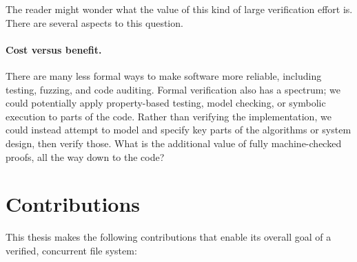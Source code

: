 The reader might wonder what the value of this kind of large verification effort
is. There are several aspects to this question.

\paragraph{Cost versus benefit.} There are many less formal ways to make
software more reliable, including testing, fuzzing, and code auditing. Formal
verification also has a spectrum; we could potentially apply property-based
testing, model checking, or symbolic execution to parts of the code. Rather than
verifying the implementation, we could instead attempt to model and specify key
parts of the algorithms or system design, then verify those. What is the
additional value of fully machine-checked proofs, all the way down to the code?

\resume

\section{Contributions}
\label{sec:intro:contributions}

This thesis makes the following contributions that enable its overall goal of a
verified, concurrent file system:

